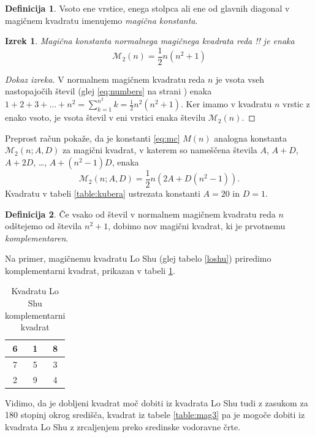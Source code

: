 \documentclass[12pt]{article}
\newcommand{\m}{\mathcal{M}_2}
\newcommand{\pojem}[1]{\emph{\color{purple}#1}}
\newenvironment{magic}[3]{
\begin{table}[!ht]
   \centering
   \caption{#2}
   \label{#3}
   \large
   \begin{tabular}{|*{#1}{c|}}\hline
}{
   \end{tabular}
   \normalsize
\end{table}
}
\theoremstyle{definition}
\newtheorem{definicija}{Definicija}
\theoremstyle{plain}
\newtheorem{izrek}{Izrek}
\begin{document}
\begin{definicija}
      Vsoto ene vrstice, enega stolpca ali ene od glavnih diagonal
      v magičnem kvadratu imenujemo \pojem{magična konstanta}.
\end{definicija}

\begin{izrek}
   Magična konstanta normalnega magičnega kvadrata reda !!
   je enaka
   \begin{equation}
      \m(n) = \frac{1}{2} n(n^2+1)
      \label{eq:mc}
   \end{equation}
\end{izrek}


\begin{proof}[Dokaz izreka]
   V normalnem magičnem kvadratu reda $n$ je vsota vseh nastopajočih
   števil (glej \eqref{eq:numbers} na strani \pageref{eq:numbers}) enaka
   $1+2+3+\dots+n^2=\sum_{k=1}^{n^2}k=\frac{1}{2}n^2(n^2+1)$. Ker imamo
   v kvadratu $n$ vrstic z enako vsoto, je vsota števil v eni vrstici
   enaka številu $\m(n)$. %
\end{proof}

Preprost račun pokaže, da je konstanti \eqref{eq:mc} $M(n)$ analogna konstanta
$\m(n;A,D)$ za magični kvadrat, v katerem so nameščena števila
$A$, $A+D$, $A+2D$, \dots, $A+(n^2-1)D$, enaka %
$$ \m(n; A,D) = \frac{1}{2} n \left(2A + D(n^2 - 1) \right). $$
Kvadratu v tabeli \ref{table:kubera} ustrezata konstanti $A=20$ in $D=1$.

\begin{definicija}
      Če vsako od števil v normalnem magičnem kvadratu reda $n$ odštejemo
      od števila $n^2+1$, dobimo nov magični kvadrat, ki je prvotnemu
      \pojem{komplementaren}.
\end{definicija}

Na primer, magičnemu kvadratu Lo Shu (glej tabelo \ref{loshu}) priredimo
komplementarni kvadrat, prikazan v tabeli \ref{table:closhu}.
%
\begin{magic}{3}{Kvadratu Lo Shu komplementarni kvadrat}{table:closhu}
   6 & 1 & 8 \\\hline
   7 & 5 & 3 \\\hline
   2 & 9 & 4 \\\hline
\end{magic}
Vidimo, da je dobljeni kvadrat moč dobiti iz kvadrata Lo Shu tudi z zasukom za
180 stopinj okrog središča, kvadrat iz tabele \ref{table:mag3} pa je mogoče dobiti
iz kvadrata Lo Shu z zrcaljenjem preko sredinske vodoravne črte.
\end{document}
